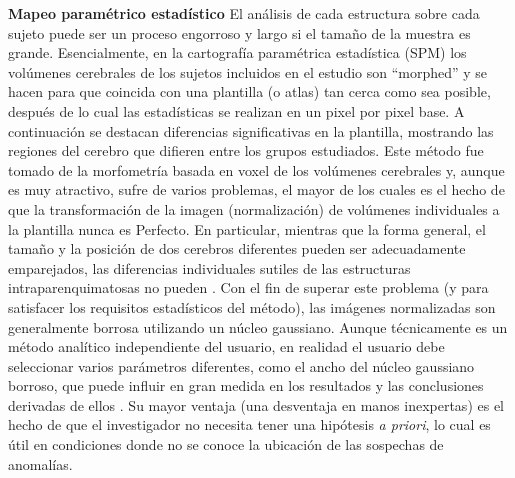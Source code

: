 \documentclass[12pt,a5,twoside]{book}
\begin{document}
\textbf{Mapeo paramétrico estadístico} El análisis de cada estructura sobre cada sujeto puede ser un proceso engorroso y largo si el tamaño de la muestra es grande. Esencialmente, en la cartografía paramétrica estadística (SPM) los volúmenes cerebrales de los sujetos incluidos en el estudio son ``morphed'' y se hacen para que coincida con una plantilla (o atlas) tan cerca como sea posible, después de lo cual las estadísticas se realizan en un pixel por pixel base. A continuación se destacan diferencias significativas en la plantilla, mostrando las regiones del cerebro que difieren entre los grupos estudiados. Este método fue tomado de la morfometría basada en voxel de los volúmenes cerebrales \citep{Wright_1995,Ashburner_2001} y, aunque es muy atractivo, sufre de varios problemas, el mayor de los cuales es el hecho de que la transformación de la imagen (normalización) de volúmenes individuales a la plantilla nunca es Perfecto. En particular, mientras que la forma general, el tamaño y la posición de dos cerebros diferentes pueden ser adecuadamente emparejados, las diferencias individuales sutiles de las estructuras intraparenquimatosas no pueden \citep{Ashburner_2001}. Con el fin de superar este problema (y para satisfacer los requisitos estadísticos del método), las imágenes normalizadas son generalmente borrosa utilizando un núcleo gaussiano. Aunque técnicamente es un método analítico independiente del usuario, en realidad el usuario debe seleccionar varios parámetros diferentes, como el ancho del núcleo gaussiano borroso, que puede influir en gran medida en los resultados y las conclusiones derivadas de ellos \citep{Jones_2005,Jones_2007}. Su mayor ventaja (una desventaja en manos inexpertas) es el hecho de que el investigador no necesita tener una hipótesis {\it a priori}, lo cual es útil en condiciones donde no se conoce la ubicación de las sospechas de anomalías.
\end{document}
